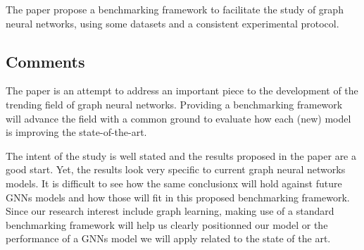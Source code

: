 \documentclass{article}
\begin{document}
The paper propose a benchmarking framework to facilitate the study of
graph neural networks, using some datasets and a consistent experimental 
protocol. 

\subsection*{Comments}
The paper is an attempt to address an important piece to the development of 
the trending field of graph neural networks. Providing a benchmarking 
framework will advance the field with a common ground to evaluate how 
each (new) model is improving the state-of-the-art. 

The intent of the study is well stated and the results proposed in the paper 
are a good start. Yet, the results look very specific to current graph 
neural networks models. It is difficult to see how the same conclusionx will 
hold against future GNNs models and how those will fit in this proposed 
benchmarking framework.\\

Since our research interest include graph learning, making use of a standard 
benchmarking framework will help us clearly positionned our model or the 
performance of a GNNs model we will apply related to the state of the art.
\end{document}
